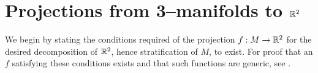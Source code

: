 \section{Projections from 3--manifolds to $\mathbb{R}^2$}
\label{section:smooth-projection}

We begin by stating the conditions required of the projection $f:M\to\mathbb{R}^2$ for the desired decomposition of $\mathbb{R}^2$, hence stratification of $M$, to exist.
For proof that an $f$ satisfying these conditions exists and that such functions are generic, see \cite{Levine65}.